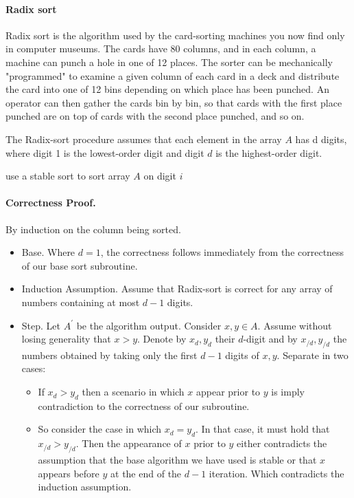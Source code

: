 \paragraph{Radix sort}
 Radix sort is the algorithm used by the card-sorting machines you now find only in computer museums. The cards have 80 columns, and in each column, a machine can punch a hole in one of 12 places. The sorter can be mechanically "programmed" to examine a given column of each card in a deck and distribute the card into one of 12 bins depending on which place has been punched. An operator can then gather the cards bin by bin, so that cards with the first place punched are on top of cards with the second place punched, and so on.

The Radix-sort procedure assumes that each element in the array $A$ has d digits, where digit 1 is the lowest-order digit and digit $d$ is the highest-order digit.


%
  \begin{algorithm}
     {
        use a stable sort to sort array $A$ on digit $i$
    }
\caption{radix-sort($A$, $n$, $d$)}
  \end{algorithm}
%

\paragraph{Correctness Proof.} By induction on the column being sorted.
\begin{itemize}
  \item Base. Where $d = 1$, the correctness follows immediately from the correctness of our base sort subroutine. 
  \item Induction Assumption. Assume that Radix-sort is correct for any array of numbers containing at most $d-1$ digits. 
  \item Step. Let $A^{\prime}$  be the algorithm output. Consider $x,y \in A$. Assume without losing generality that $x > y$. Denote by $x_{d}, y_{d}$ their $d$-digit and by $x_{/d}, y_{/d}$ the numbers obtained by taking only the first  $d-1$ digits of $x,y$. Separate in two cases:

    \begin{itemize}
      \item   If $x_{d} > y_{d}$ then a scenario in which $x$ appear prior to $y$ is  imply contradiction to the correctness of our subroutine.
      \item   So consider the case in which $x_{d} = y_{d}$. In that case, it must hold that $x_{/d} > y_{/d}$. Then the appearance of $x$ prior to $y$ either contradicts the assumption that the base algorithm we have used is stable or that $x$ appears before $y$ at the end of the $d-1$ iteration. Which contradicts the induction assumption. 
    \end{itemize}
 \end{itemize}


